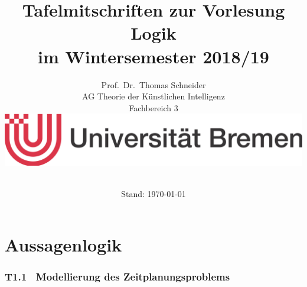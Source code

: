 \documentclass[fontsize=11pt, twoside=false, numbers=autoenddot]{scrbook}
\title{Tafelmitschriften zur Vorlesung \glqq Logik\grqq\\ im Wintersemester 2018/19}
\author{%
  Prof.\ Dr.\ Thomas Schneider\\[1pt]
  AG Theorie der Künstlichen Intelligenz \\[1pt]
  Fachbereich 3 \\
  \includegraphics[width=.4\linewidth]{logo_ub.jpg} \\[\baselineskip]~%
}
\date{Stand: \today}
\begin{document}
\maketitle
\tableofcontents

\part{Aussagenlogik}

\section*{T1.1~ Modellierung des Zeitplanungsproblems}
\end{document}
